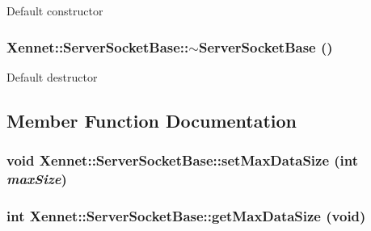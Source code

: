 Default constructor \hypertarget{classXennet_1_1ServerSocketBase_c83e50e3708c65f0d578098798df0045}{
\subsubsection{\setlength{\rightskip}{0pt plus 5cm}Xennet::ServerSocketBase::$\sim$ServerSocketBase ()}}
\label{classXennet_1_1ServerSocketBase_c83e50e3708c65f0d578098798df0045}


Default destructor 

\subsection{Member Function Documentation}
\hypertarget{classXennet_1_1ServerSocketBase_b7e2795ed9e29eca5a2192bb048fe2a7}{
\subsubsection{\setlength{\rightskip}{0pt plus 5cm}void Xennet::ServerSocketBase::setMaxDataSize (int {\em maxSize})}}
\label{classXennet_1_1ServerSocketBase_b7e2795ed9e29eca5a2192bb048fe2a7}


\hypertarget{classXennet_1_1ServerSocketBase_6825c1738c87620724714dcc0962536c}{
\subsubsection{\setlength{\rightskip}{0pt plus 5cm}int Xennet::ServerSocketBase::getMaxDataSize (void)}}
\label{classXennet_1_1ServerSocketBase_6825c1738c87620724714dcc0962536c}




